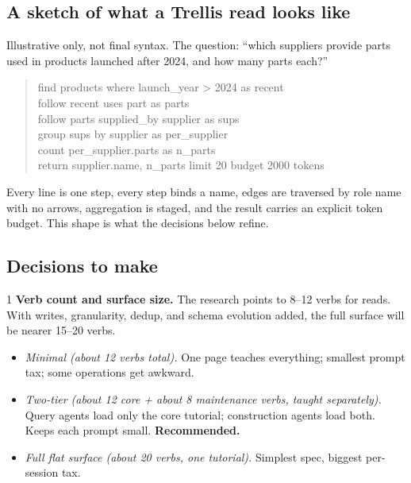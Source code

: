 \documentclass[11pt]{article}
\begin{document}
\subsection{A sketch of what a Trellis read looks like}

Illustrative only, not final syntax. The question: ``which suppliers provide parts used in products launched after 2024, and how many parts each?''

\begin{quote}
\ttfamily\small
find products where launch\_year > 2024 as recent\\
follow recent uses part as parts\\
follow parts supplied\_by supplier as sups\\
group sups by supplier as per\_supplier\\
count per\_supplier.parts as n\_parts\\
return supplier.name, n\_parts limit 20 budget 2000 tokens
\end{quote}

Every line is one step, every step binds a name, edges are traversed by role name with no arrows, aggregation is staged, and the result carries an explicit token budget. This shape is what the decisions below refine.

\subsection{Decisions to make}

\begin{decisionbox}{1}
\textbf{Verb count and surface size.} The research points to 8--12 verbs for reads. With writes, granularity, dedup, and schema evolution added, the full surface will be nearer 15--20 verbs.
\begin{itemize}[leftmargin=1.4em,itemsep=1pt]
  \item[A.] \emph{Minimal (about 12 verbs total).} One page teaches everything; smallest prompt tax; some operations get awkward.
  \item[B.] \emph{Two-tier (about 12 core + about 8 maintenance verbs, taught separately).} Query agents load only the core tutorial; construction agents load both. Keeps each prompt small. \textbf{Recommended.}
  \item[C.] \emph{Full flat surface (about 20 verbs, one tutorial).} Simplest spec, biggest per-session tax.
\end{itemize}
\end{decisionbox}
\end{document}
